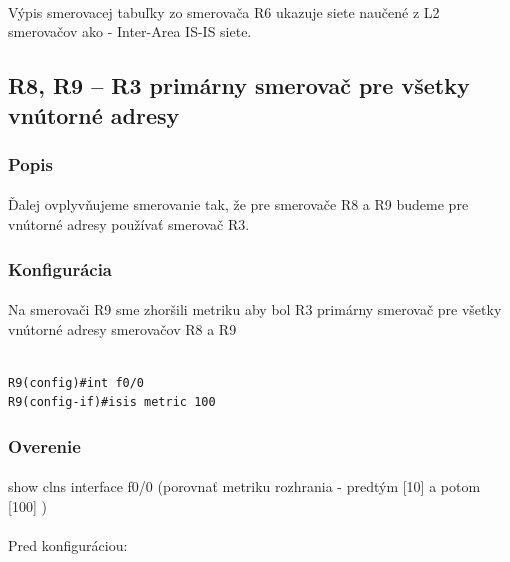 \documentclass[12pt,twoside,a4paper]{report}
\begin{document}
\paragraph{}
Výpis smerovacej tabuľky zo smerovača R6 ukazuje siete naučené z L2 smerovačov ako  - Inter-Area IS-IS siete.





\subsection{R8, R9 – R3 primárny smerovač pre všetky vnútorné adresy}
\label{R8_primarny_smerovac}
\subsubsection{Popis}
\paragraph{}
Ďalej ovplyvňujeme smerovanie tak, že pre smerovače R8 a R9 budeme pre vnútorné adresy používať smerovač R3.


\subsubsection{Konfigurácia}
\paragraph{}
Na smerovači R9 sme zhoršili metriku aby bol R3 primárny smerovač pre všetky vnútorné adresy smerovačov R8 a R9

\noindent
{\selectfont
\begin{small}
\begin{verbatim}

R9(config)#int f0/0
R9(config-if)#isis metric 100
\end{verbatim}
\end{small}
}

\subsubsection{Overenie}
\paragraph{}
show clns interface f0/0 (porovnať metriku rozhrania - predtým [10] a potom [100] )


\paragraph{}
Pred konfiguráciou:
\end{document}
